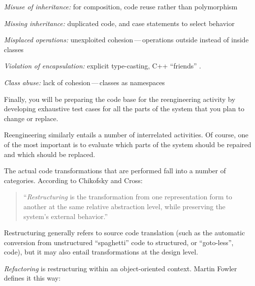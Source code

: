 \documentclass[a4paper,10pt,twoside]{book}
\begin{document}
\begin{bulletlist}
  \item \emph{Misuse of inheritance:}
  for composition, code reuse rather than polymorphism

  \item \emph{Missing inheritance:}
  duplicated code, and case statements to select behavior

  \item \emph{Misplaced operations:}
  unexploited cohesion\,---\,operations outside instead of inside classes

  \item \emph{Violation of encapsulation:}
  explicit type-casting, C++ ``friends'' . 

  \item \emph{Class abuse:}
  lack of cohesion\,---\,classes as namespaces
\end{bulletlist}

Finally, you will be preparing the code base for the reengineering activity by developing exhaustive test cases for all the parts of the system that you plan to change or replace.

Reengineering similarly entails a number of interrelated activities. Of course, one of the most important is to evaluate which parts of the system should be repaired and which should be replaced.

The actual code transformations that are performed fall into a number of categories. According to Chikofsky and Cross:

\begin{quotation}
\noindent
``\emph{Restructuring} is the transformation from one representation form to another at the same relative abstraction level, while preserving the system's external behavior.''
\end{quotation}

Restructuring generally refers to source code translation (such as the automatic conversion from unstructured ``spaghetti'' code to structured, or ``goto-less'', code), but it may also entail transformations at the design level. 

\emph{Refactoring} is restructuring within an object-oriented context. Martin Fowler defines it this way:
\end{document}

